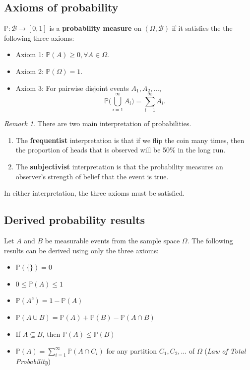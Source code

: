 \documentclass[
]{book}
\providecommand{\tightlist}{%
  \setlength{\itemsep}{0pt}\setlength{\parskip}{0pt}}
\newcommand{\bbP}{\mathbb{P}}
\newcommand{\cB}{{\mathcal B}}
\theoremstyle{definition}
\theoremstyle{definition}
\theoremstyle{definition}
\theoremstyle{definition}
\theoremstyle{remark}
\newtheorem*{remark}{Remark}
\begin{document}
\hypertarget{axioms-of-probability}{%
\subsection{Axioms of probability}\label{axioms-of-probability}}

\(\bbP:\cB\to[0,1]\) is a \textbf{probability measure} on \((\Omega, \cB)\) if it satisfies the the following three axioms:

\begin{itemize}
\tightlist
\item
  Axiom 1: \(\bbP(A) \geq 0, \forall A \in \Omega\).
\item
  Axiom 2: \(\bbP(\Omega) = 1\).
\item
  Axiom 3: For pairwise disjoint events \(A_1,A_2,\dots\),
  \[
  \bbP\bigg( \bigcup_{i=1}^\infty A_i  \bigg) = \sum_{i=1}^\infty A_i.
  \]
\end{itemize}

\begin{remark}
There are two main interpretation of probabilities.

\begin{enumerate}
\def\labelenumi{\arabic{enumi}.}
\item
  The \textbf{frequentist} interpretation is that if we flip the coin many times, then the proportion of heads that is observed will be 50\% in the long run.
\item
  The \textbf{subjectivist} interpretation is that the probability measures an observer's strength of belief that the event is true.
\end{enumerate}

In either interpretation, the three axioms must be satisfied.
\end{remark}

\hypertarget{derived-probability-results}{%
\subsection{Derived probability results}\label{derived-probability-results}}

Let \(A\) and \(B\) be measurable events from the sample space \(\Omega\).
The following results can be derived using only the three axioms:

\begin{itemize}
\tightlist
\item
  \(\bbP(\{ \}) = 0\)
\item
  \(0\leq\bbP(A)\leq 1\)
\item
  \(\bbP(A^c)=1-\bbP(A)\)
\item
  \(\bbP(A \cup B) = \bbP(A) + \bbP(B) - \bbP(A \cap B)\)
\item
  If \(A \subseteq B\), then \(\bbP(A) \leq \bbP(B)\)
\item
  \(\bbP(A) = \sum_{i=1}^\infty \bbP(A \cap C_i)\) for any partition \(C_1,C_2,\dots\) of \(\Omega\) (\emph{Law of Total Probability})
\end{itemize}
\end{document}
